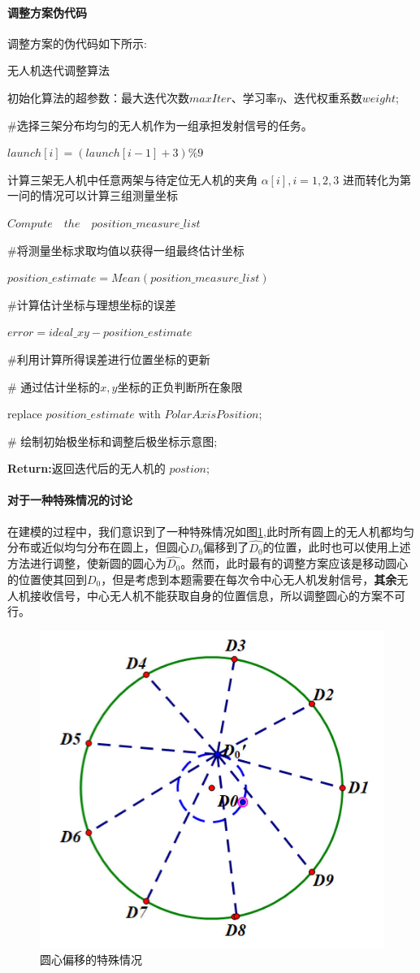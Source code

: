 \documentclass[withoutpreface,bwprint]{cumcmthesis} %
\begin{document}
			\paragraph{调整方案伪代码}
			调整方案的伪代码如下所示:
			\par
			\begin{algorithm}[H]
				\caption{无人机迭代调整算法}
				初始化算法的超参数：最大迭代次数$ maxIter $、学习率$ \eta $、迭代权重系数$ weight $;
				\par {}
				{
					\#选择三架分布均匀的无人机作为一组承担发射信号的任务。
					\par  $ launch[i] =(launch[i-1] + 3) \% 9 $
					\par {}
					{
						计算三架无人机中任意两架与待定位无人机的夹角 $\alpha[i],i=1,2,3 $ \;
						进而转化为第一问的情况可以计算三组测量坐标
						\par $ Compute\quad the\quad position\_measure\_list $
						\par \#将测量坐标求取均值以获得一组最终估计坐标
						\par  $ position\_estimate= Mean(position\_measure\_list) $
						\par \#计算估计坐标与理想坐标的误差
						\par$  error = ideal\_xy -position\_estimate $
						\par \#利用计算所得误差进行位置坐标的更新
						\par {}
						{
							\# 通过估计坐标的$ x,y $坐标的正负判断所在象限
							\par replace $position\_estimate$ with $ PolarAxisPosition $;
						}
					}
					\# 绘制初始极坐标和调整后极坐标示意图;		
				}
				\textbf{Return:}返回迭代后的无人机的 $postion$;
				\label{code1}
			\end{algorithm}
			\paragraph{对于一种特殊情况的讨论}
		在建模的过程中，我们意识到了一种特殊情况如图\ref{fig17},此时所有圆上的无人机都均匀分布或近似均匀分布在圆上，但圆心$D_0$偏移到了$\widehat{D_0}$的位置，此时也可以使用上述方法进行调整，使新圆的圆心为$\widehat{D_0}$。然而，此时最有的调整方案应该是移动圆心的位置使其回到$D_0$，但是考虑到本题需要在每次令中心无人机发射信号，\textbf{其余}无人机接收信号，中心无人机不能获取自身的位置信息，所以调整圆心的方案不可行。
		\begin{figure}[H]
			\centering
			\includegraphics[width=0.35\linewidth]{./figures/17}
			\caption{圆心偏移的特殊情况}
			\label{fig17}
		\end{figure}
\end{document}
